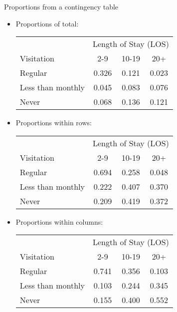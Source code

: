 \documentclass[xcolor=dvipsnames]{beamer}
\begin{document}
\begin{frame}{Proportions from a contingency table}
	\begin{itemize}
		\item Proportions of total: \pause
		{\scriptsize
		\begin{center}
			\begin{tabular}{|l|ccc|}
				  \hline
				  & \multicolumn{3}{c|}{Length of Stay (LOS)}\\
  				Visitation & 2-9 & 10-19 & 20+ \\ \hline
				Regular          & 0.326& 0.121& 0.023 \\
				Less than monthly& 0.045& 0.083& 0.076 \\
				Never            & 0.068& 0.136& 0.121 \\ \hline
			\end{tabular}
		\end{center}} \pause
	 \vspace{1mm}
		\item Proportions within rows:
			{\scriptsize
			\begin{center}
				\begin{tabular}{|l|ccc|}
					\hline
					& \multicolumn{3}{c|}{Length of Stay (LOS)}\\
					Visitation & 2-9 & 10-19 & 20+ \\ \hline
				Regular           & 0.694 & 0.258 & 0.048 \\
				Less than monthly & 0.222 & 0.407 & 0.370 \\
				Never             & 0.209 & 0.419 & 0.372 \\ \hline
				\end{tabular}
		\end{center}} \pause
	\vspace{1mm}
		\item Proportions within columns:
		{\scriptsize
			\begin{center}
				\begin{tabular}{|l|ccc|}
					\hline
					& \multicolumn{3}{c|}{Length of Stay (LOS)}\\
					Visitation & 2-9 & 10-19 & 20+ \\ \hline
				Regular            &0.741  &0.356  &0.103 \\
				Less than monthly  &0.103  &0.244  &0.345 \\
				Never              &0.155  &0.400  &0.552 \\ \hline
				\end{tabular}
		\end{center}}
	\end{itemize}
\end{frame}
\end{document}
